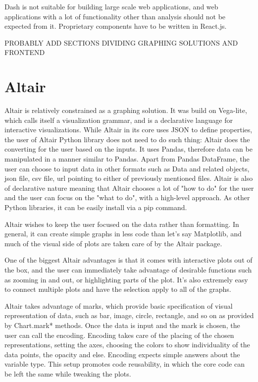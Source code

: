 Dash is not suitable for building large scale web applications, and web applications with a lot of functionality other than analysis should not be expected from it. Proprietary components have to be written in React.js. 

PROBABLY ADD SECTIONS DIVIDING GRAPHING SOLUTIONS AND FRONTEND

\section{Altair}
\label{sec:networkx}
Altair is relatively constrained as a graphing solution. It was build on Vega-lite, which calls itself a visualization grammar, and is a declarative language for interactive visualizations. While Altair in its core uses JSON to define properties, the user of Altair Python library does not need to do such thing: Altair does the converting for the user based on the inputs. It uses Pandas, therefore data can be manipulated in a manner similar to Pandas. Apart from Pandas DataFrame, the user can choose to input data in other formats such as Data and related objects, json file, csv file, url pointing to either of previously mentioned files. Altair is also of declarative nature meaning that Altair chooses a lot of "how to do" for the user and the user can focus on the "what to do", with a high-level approach. As other Python libraries, it can be easily install via a pip command. 

Altair wishes to keep the user focused on the data rather than formatting. In general, it can create simple graphs in less code than let's say Matplotlib, and much of the visual side of plots are taken care of by the Altair package. 

One of the biggest Altair advantages is that it comes with interactive plots out of the box, and the user can immediately take advantage of desirable functions such as zooming in and out, or highlighting parts of the plot. It's also extremely easy to connect multiple plots and have the selection apply to all of the graphs. 

Altair takes advantage of marks, which provide basic specification of visual representation of data, such as bar, image, circle, rectangle, and so on as provided by Chart.mark* methods. Once the data is input and the mark is chosen, the user can call the encoding. Encoding takes care of the placing of the chosen representations, setting the axes, choosing the colors to show individuality of the data points, the opacity and else. Encoding expects simple answers about the variable type. This setup promotes code reusability, in which the core code can be left the same while tweaking the plots.

